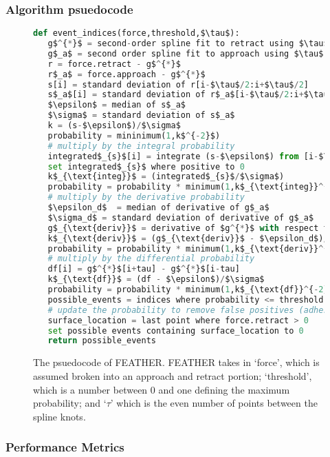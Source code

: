 \documentclass[%
  aip,12pt,tightenlines,
  amsthm,
 amsmath,amssymb
]{article}
\newcommand{\fLabel}[1]{\label{figure:#1}}
\newcommand{\pEndF}[0]{ \\ }
\newcommand{\pStartF}[0]{ }
\newcommand{\name}[0]{FEATHER}
\begin{document}
\clearpage

\subsubsection{Algorithm psuedocode}

\begin{figure}
  \begin{lstlisting}[language=Python]
def event_indices(force,threshold,$\tau$):
   g$^{*}$ = second-order spline fit to retract using $\tau$ for knots
   g$_a$ = second order spline fit to approach using $\tau$ for knots
   r = force.retract - g$^{*}$
   r$_a$ = force.approach - g$^{*}$
   s[i] = standard deviation of r[i-$\tau$/2:i+$\tau$/2]
   s$_a$[i] = standard deviation of r$_a$[i-$\tau$/2:i+$\tau$/2]
   $\epsilon$ = median of s$_a$
   $\sigma$ = standard deviation of s$_a$
   k = (s-$\epsilon$)/$\sigma$
   probability = mininimum(1,k$^{-2}$)
   # multiply by the integral probability 
   integrated$_{s}$[i] = integrate (s-$\epsilon$) from [i-$\tau$] to [i+$\tau$]
   set integrated$_{s}$ where positive to 0
   k$_{\text{integ}}$ = (integrated$_{s}$/$\sigma$)
   probability = probability * minimum(1,k$_{\text{integ}}^{-2}$)
   # multiply by the derivative probability
   $\epsilon_d$  = median of derivative of g$_a$
   $\sigma_d$ = standard deviation of derivative of g$_a$
   g$_{\text{deriv}}$ = derivative of $g^{*}$ with respect to time
   k$_{\text{deriv}}$ = (g$_{\text{deriv}}$ - $\epsilon_d$)/$\sigma_d$
   probability = probability * minimum(1,k$_{\text{deriv}}^{-2}$)
   # multiply by the differential probability 
   df[i] = g$^{*}$[i+tau] - g$^{*}$[i-tau]
   k$_{\text{df}}$ = (df - $\epsilon$)/$\sigma$
   probability = probability * minimum(1,k$_{\text{df}}^{-2}$)
   possible_events = indices where probability <= threshold
   # update the probability to remove false positives (adhesions)
   surface_location = last point where force.retract > 0
   set possible events containing surface_location to 0
   return possible_events
\end{lstlisting}
\caption[\name{} psuedocode]{\noindent\fLabel{Code}\pStartF The psuedocode of \name{}. \name{} takes in `force', which is assumed broken into an approach and retract portion; `threshold', which is a number between 0 and one defining the maximum probability; and `$\tau$' which is the even number of points between the spline knots. \pEndF }
\end{figure}

\clearpage

\subsubsection{Performance Metrics}
\end{document}
